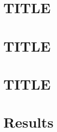 
\section{TITLE}
\label{sec:bs14}


\section{TITLE}
\label{sec:bs15}


\section{TITLE}
\label{sec:bs16}


\section{Results}
\label{sec:results-proposed}

